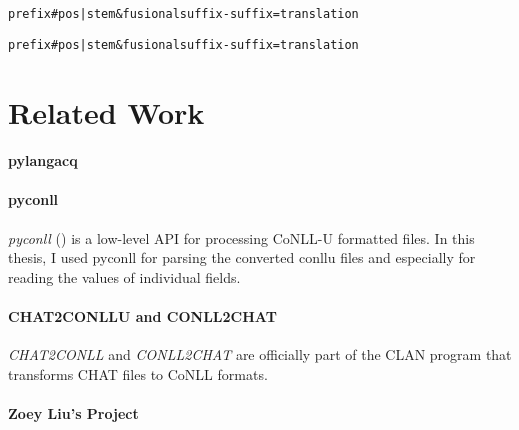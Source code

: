 \texttt{prefix\#pos|stem\&fusionalsuffix-suffix=translation}


\texttt{prefix\#pos|stem\&fusionalsuffix-suffix=translation}


\section{Related Work}

\paragraph{pylangacq} %
\label{par:pylangacq}

\paragraph{pyconll} %
\label{par:pyconll}
\emph{pyconll} (\cite{pyconll}) is a low-level API for processing CoNLL-U formatted files. In this thesis, I used pyconll for parsing the converted conllu files and especially for reading the values of individual fields.

\paragraph{CHAT2CONLLU and CONLL2CHAT} %
\label{par:chat2conllu}
\emph{CHAT2CONLL} and \emph{CONLL2CHAT} are officially part of the CLAN program that transforms CHAT files to CoNLL formats.

\paragraph{Zoey Liu's Project} %
\label{par:zoey}
